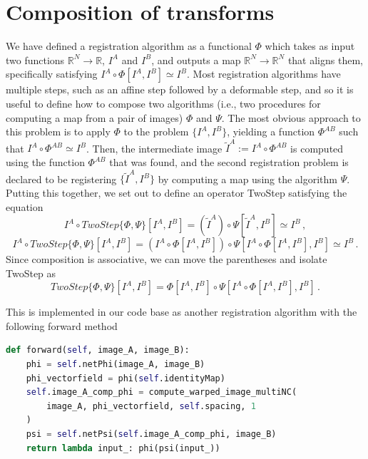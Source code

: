 \documentclass[10pt,onecolumn,letterpaper]{article} %
\begin{document}
\section{Composition of transforms}
We have defined a registration algorithm as a functional $\Phi$ which takes as input two functions $\mathbb{R}^N \rightarrow \mathbb{R}$,
$I^{A}$ and $I^B$, and outputs a map $\mathbb{R}^N \rightarrow \mathbb{R}^N$ that aligns them, specifically satisfying $I^A \circ \Phi[I^A, I^B] \simeq I^B$.
Most registration algorithms have multiple steps, such as an affine step followed by a deformable step, and so it is useful to define how to compose two algorithms (i.e., two procedures for computing a map from a pair of images) $\Phi$ and $\Psi$. 
The most obvious approach to this problem is to apply $\Phi$ to the problem $\{I^A, I^B\}$, yielding a function  $\Phi^{AB}$ such that $I^A \circ \Phi^{AB} \simeq I^B$. Then, the intermediate image $\tilde{I}^A := I^A \circ \Phi^{AB}$ is computed using the function $\Phi^{AB}$ that was found, and the second registration problem is declared to be registering $\{\tilde{I}^A, I^B\}$ by computing a map using the algorithm $\Psi$.
Putting this together, we set out to define an operator TwoStep satisfying the equation
\begin{equation}
I^A \circ TwoStep\{\Phi, \Psi\}[I^{A}, I^B] = (\tilde{I}^{A}) \circ \Psi[\tilde{I}^A, I^B] \simeq I^B \,,
\end{equation}
\begin{equation}
I^A \circ TwoStep\{\Phi, \Psi\}[I^{A}, I^B] = (I^{A} \circ \Phi[I^A, I^B]) \circ \Psi[I^A \circ \Phi[I^A, I^B], I^B] \simeq I^B \,.
\end{equation}
Since composition is associative, we can move the parentheses and isolate TwoStep as 
\begin{equation}
TwoStep\{\Phi, \Psi\}[I^{A}, I^B] = \Phi[I^A, I^B] \circ \Psi[I^A \circ \Phi[I^A, I^B], I^B] \,.
\end{equation}
    
\noindent This is implemented in our code base as another registration algorithm with the following forward method 
\begin{lstlisting}[language=Python]
def forward(self, image_A, image_B):
    phi = self.netPhi(image_A, image_B)
    phi_vectorfield = phi(self.identityMap)
    self.image_A_comp_phi = compute_warped_image_multiNC(
        image_A, phi_vectorfield, self.spacing, 1
    )
    psi = self.netPsi(self.image_A_comp_phi, image_B)
    return lambda input_: phi(psi(input_))
\end{lstlisting}
\end{document}
